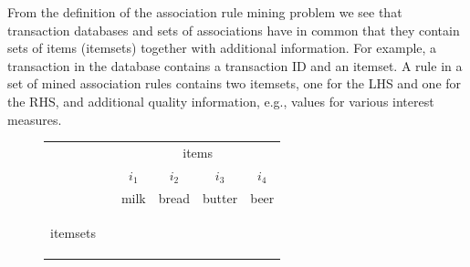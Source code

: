 \documentclass[10pt,a4paper]{article}
\newcommand{\set}[1]{\mathcal{#1}}
\begin{document}
From the definition of the association rule mining problem we see that
transaction databases and sets of associations have in common that 
they contain sets of items (itemsets) together with additional information.
For example, a transaction in the database 
contains a transaction ID and an itemset.
A rule in a set of mined association rules 
contains two itemsets, one for the LHS and one for the RHS, 
and additional quality information, e.g., values for various interest measures.



\begin{figure}[tp]
\centering

\renewcommand{\arraystretch}{1.1}
\setlength{\tabcolsep}{2mm}
\begin{tabular}{cl|cccc}
& & \multicolumn{4}{c}{items}\\

& & $i_1$ & $i_2$ & $i_3$ &  $i_4$ \\
& & milk & bread & butter  & beer \\
\cline{2-6}
\multirow{4}{*}{\begin{sideways} itemsets \end{sideways}}



\end{tabular}
\end{figure}
\end{document}
